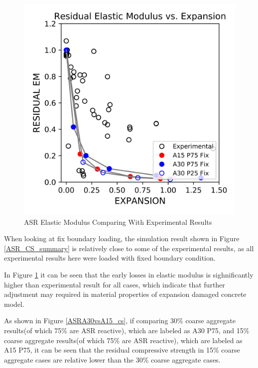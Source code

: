 \begin{figure}[ht!]
\centering
\includegraphics[width=.8\linewidth]{Files/CS_plot/ASREM_all.png}
  \caption{ASR Elastic Modulus Comparing With Experimental Results}
  \label{ASR_EM_summary}
\end{figure}

When looking at fix boundary loading, the simulation result shown in Figure \ref{ASR_CS_summary} is relatively close to some of the experimental results, as all experimental results here were loaded with fixed boundary condition.

In Figure \ref{ASR_EM_summary} it can be seen that the early losses in elastic modulus is sighnificantly higher than experimental result for all cases, which indicate that further adjustment may required in material properties of expansion damaged concrete model.

As shown in Figure \ref{ASRA30vsA15_cs}, if comparing 30\% coarse aggregate results(of which 75\% are ASR reactive), which are labeled as A30 P75, and 15\% coarse aggregate results(of which 75\% are ASR reactive), which are labeled as A15 P75, it can be seen that the residual compressive strength in 15\% coarse aggregate cases are relative lower than the 30\% coarse aggregate cases.

